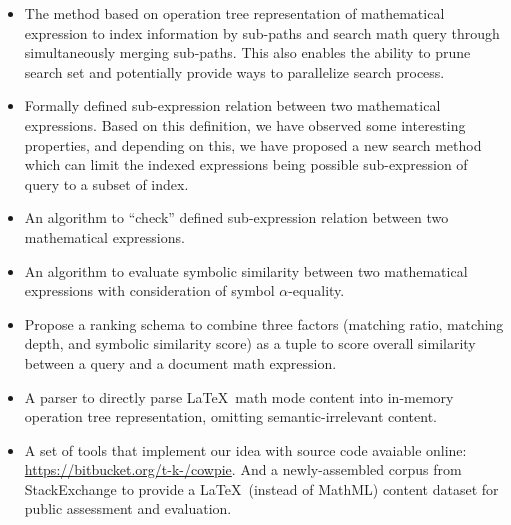 \begin{itemize}
\item The method based on operation tree representation of mathematical expression to index information by sub-paths and search math query through simultaneously merging sub-paths. This also enables the ability to prune search set and potentially provide ways to parallelize search process. 
\item Formally defined sub-expression relation between two mathematical expressions. Based on this definition, we have observed some interesting properties, and depending on this, we have proposed a new search method which can limit the indexed expressions being possible sub-expression of query to a subset of index.
\item An algorithm to ``check'' defined sub-expression relation between two mathematical expressions. 
\item An algorithm to evaluate symbolic similarity between two mathematical expressions with consideration of symbol $\alpha$-equality. 
\item Propose a ranking schema to combine three factors (matching ratio, matching depth, and symbolic similarity score) as a tuple to score overall similarity between a query and a document math expression.
\item A parser to directly parse \LaTeX\ math mode content into in-memory operation tree representation, omitting semantic-irrelevant content. 
\item A set of tools that implement our idea with source code avaiable online: \url{https://bitbucket.org/t-k-/cowpie}.
And a newly-assembled corpus from StackExchange to provide a \LaTeX\ (instead of MathML) content dataset for public assessment and evaluation. 
\end{itemize}
